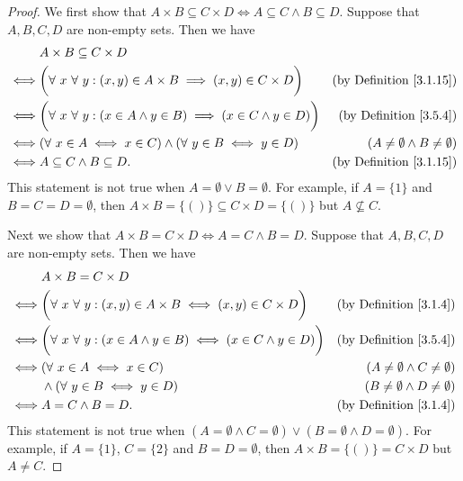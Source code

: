 \begin{proof}
    We first show that \(A \times B \subseteq C \times D \iff A \subseteq C \land B \subseteq D\).
    Suppose that \(A, B, C, D\) are non-empty sets.
    Then we have
    \begin{align*}
             & A \times B \subseteq C \times D                                                                                                           \\
        \iff & \bigg(\forall\ x \ \forall\ y : (x, y) \in A \times B \implies (x, y) \in C \times D\bigg)    & \text{(by Definition \ref{3.1.15})}       \\
        \iff & \bigg(\forall\ x \ \forall\ y :(x \in A \land y \in B) \implies (x \in C \land y \in D)\bigg) & \text{(by Definition \ref{3.5.4})}        \\
        \iff & (\forall\ x \in A \iff x \in C) \land (\forall\ y \in B \iff y \in D)                         & (A \neq \emptyset \land B \neq \emptyset) \\
        \iff & A \subseteq C \land B \subseteq D.                                                            & \text{(by Definition \ref{3.1.15})}
    \end{align*}
    This statement is not true when \(A = \emptyset \lor B = \emptyset\).
    For example, if \(A = \{1\}\) and \(B = C = D = \emptyset\), then \(A \times B = \{()\} \subseteq C \times D = \{()\}\) but \(A \not \subseteq C\).

    Next we show that \(A \times B = C \times D \iff A = C \land B = D\).
    Suppose that \(A, B, C, D\) are non-empty sets.
    Then we have
    \begin{align*}
             & A \times B = C \times D                                                                                                                \\
        \iff & \bigg(\forall\ x \ \forall\ y : (x, y) \in A \times B \iff (x, y) \in C \times D\bigg)     & \text{(by Definition \ref{3.1.4})}        \\
        \iff & \bigg(\forall\ x \ \forall\ y : (x \in A \land y \in B) \iff (x \in C \land y \in D)\bigg) & \text{(by Definition \ref{3.5.4})}        \\
        \iff & (\forall\ x \in A \iff x \in C)                                                            & (A \neq \emptyset \land C \neq \emptyset) \\
             & \land (\forall\ y \in B \iff y \in D)                                                      & (B \neq \emptyset \land D \neq \emptyset) \\
        \iff & A = C \land B = D.                                                                         & \text{(by Definition \ref{3.1.4})}
    \end{align*}
    This statement is not true when \((A = \emptyset \land C = \emptyset) \lor (B = \emptyset \land D = \emptyset)\).
    For example, if \(A = \{1\}\), \(C = \{2\}\) and \(B = D = \emptyset\), then \(A \times B = \{()\} = C \times D\) but \(A \neq C\).
\end{proof}

